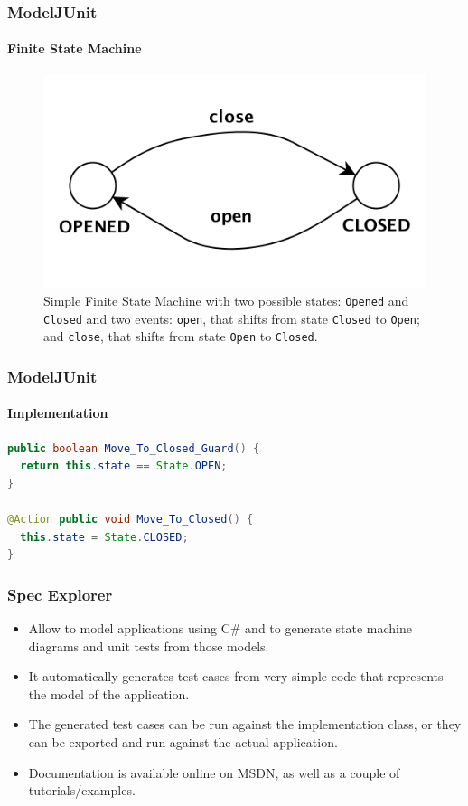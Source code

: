 \documentclass[notes]{beamer}
\begin{document}
\begin{frame}[fragile]
\frametitle{ModelJUnit}
\framesubtitle{Finite State Machine}

\begin{figure}
\centering
\includegraphics[scale=0.8]{finite-state-machine.png}
\caption{Simple Finite State Machine with two possible states: \texttt{Opened} and \texttt{Closed} and two events: \texttt{open}, that shifts from state \texttt{Closed} to \texttt{Open}; and \texttt{close}, that shifts from state \texttt{Open} to \texttt{Closed}.}
\label{fig:finite-state-machine}
\end{figure}
\end{frame}

\begin{frame}[fragile]
\frametitle{ModelJUnit}
\framesubtitle{Implementation}
\begin{lstlisting}[language=Java,basicstyle=\ttfamily,keywordstyle=\color{red},caption={Snippet that represents a transition/event of the model. It must use the \texttt{@Action} annotation. Guards can also be defined. In this case, it can only move to closed if the current state is open.}, captionpos=b]
public boolean Move_To_Closed_Guard() {
  return this.state == State.OPEN;
}

@Action public void Move_To_Closed() {
  this.state = State.CLOSED;
}

\end{lstlisting}
\end{frame}

\begin{frame}
  \frametitle{Spec Explorer}
  \begin{itemize}[<+->]
    \item Allow to model applications using C\# and to generate state machine diagrams and unit tests from those models.
    \item It automatically generates test cases from very simple code that represents the model of the application.
    \item The generated test cases can be run against the implementation class, or they can be exported and run against the actual application.
    \item Documentation is available online on MSDN, as well as a couple of tutorials/examples.
  \end{itemize}
\end{frame}
\end{document}
